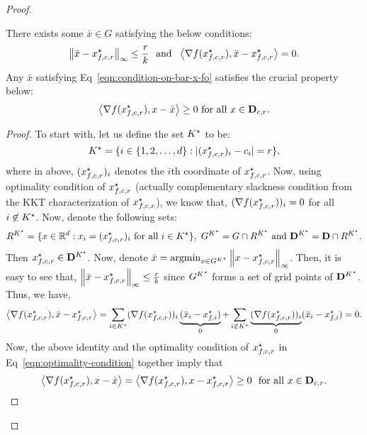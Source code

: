 \begin{proof}
\begin{lemma}
\label{lemma:simple-but-important}
There exists some $\bar{x} \in G$ satisfying the below conditions: 
\begin{equation}
\label{eqn:condition-on-bar-x-fo}
\left\|{\bar{x} - x_{f, c, r}^\star}\right\|_\infty \leq \frac{r}{k}~~\text{and}~~
	\left<\nabla f(x_{f, c, r}^\star), \bar{x} - x_{f, c, r}^\star \right> = 0.
\end{equation}
Any $\bar{x}$ satisfying Eq~\eqref{eqn:condition-on-bar-x-fo} 
satisfies the crucial property below: 
\begin{equation}
\label{eqn:condition-on-bar-x-fo-ext}
\left<\nabla f(x_{f, c, r}^\star), x - \bar{x}\right> \geq 0~\text{for all $x\in \mathbf{D}_{c, r}$}.
\end{equation}
\end{lemma}
\begin{proof}
To start with, let us define the set $K^\star$ to be: 
\begin{equation*}
K^\star = \{i\in \{1, 2, \ldots, d\}: |(x_{f, c, r}^\star)_i - c_i| = r\},
\end{equation*}
where in above, $(x_{f, c, r}^\star)_i$ denotes the $i$th coordinate of $x_{f, c, r}^\star$. 
Now, using optimality condition of $x_{f, c, r}^\star$ (actually complementary slackness 
condition from the KKT characterization of $x_{f, c, r}^\star$), we know that, 
$(\nabla f(x_{f, c, r}^\star))_i = 0$ for all $i\not\in K^\star$. Now, denote the following sets:
\begin{equation*}
R^{K^\star} = \{x\in \mathbb{R}^d: x_i = (x_{f, c, r}^\star)_i~\text{for all $i \in K^\star$}\},~
	G^{K^\star}  = G \cap R^{K^\star}~
		\text{and}~\mathbf{D}^{K^\star} = \mathbf{D} \cap R^{K^\star}.
\end{equation*}
Then $x_{f, c, r}^\star \in \mathbf{D}^{K^\star}$. Now, denote 
$\bar{x} = \argmin_{x\in G^{K\opt}} \norm{x- x_{f, c, r}\opt}_\infty$.
Then, it is easy to see that, $\left\|{\bar{x} - x_{f, c, r}^\star}\right\|_\infty \leq \frac{r}{k}$ since 
$G^{K^\star}$ forms a set of grid points of $\mathbf{D}^{K^\star}$. Thus, we have,  
\begin{equation*}
\left<\nabla f(x_{f, c, r}^\star), \bar{x} - x_{f, c, r}^\star\right> = 
	\sum_{i\in K^\star}(\nabla f(x_{f, c, r}^\star))_i \underbrace{(\bar{x}_{i} - x^\star_{f, i})}_0
	+ \sum_{i\not\in K^\star}\underbrace{(\nabla f(x_{f, c, r}^\star))_i}_0 (\bar{x}_{i} - x^\star_{f, i}) = 0.
\end{equation*}
Now, the above identity and the optimality condition of $x_{f, c, r}^\star$ in 
Eq~\eqref{eqn:optimality-condition} together imply that
\begin{equation*}
\left<\nabla f(x_{f, c, r}^\star), x - \bar{x}\right> = 	
	\left<\nabla f(x_{f, c, r}^\star), x - x_{f, c, r}^\star\right> \geq 0
	~~\text{for all $x\in \mathbf{D}_{c, r}$}.
\end{equation*}
\end{proof}




\end{proof}
